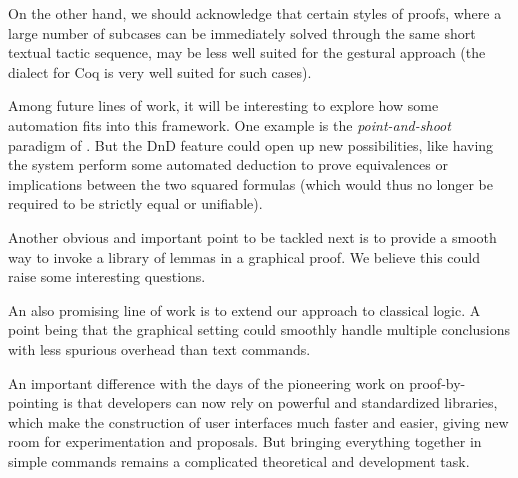 On the other hand, we should acknowledge that certain styles of proofs,
where a large number of subcases can be immediately solved through the
same short textual tactic sequence, may be less well suited for the
gestural approach (the \ssreflect~\cite{SSR} dialect for Coq is very
well suited for such cases).


Among future lines of work, it will be interesting to explore how some
automation fits into this framework. One example is the \emph{point-and-shoot}
paradigm of \cite{PbP}. But the DnD feature could open up new possibilities,
like having the system perform some automated deduction to prove equivalences or
implications between the two squared formulas (which would thus no longer be
required to be strictly equal or unifiable).

Another obvious and important point to be tackled next is to provide a
smooth way to invoke a library of lemmas in a graphical proof. We
believe this could raise some interesting questions.

An also promising line of work is to extend our approach to classical
logic. A point being that the graphical setting could smoothly handle
multiple conclusions with less spurious overhead than text commands.


An important difference with the days of the
pioneering work on proof-by-pointing is that developers can now rely on
powerful and standardized libraries, which make the construction of
user interfaces much faster and easier, giving new room for
experimentation and proposals. But bringing everything together in
simple commands remains a complicated theoretical and development task.
